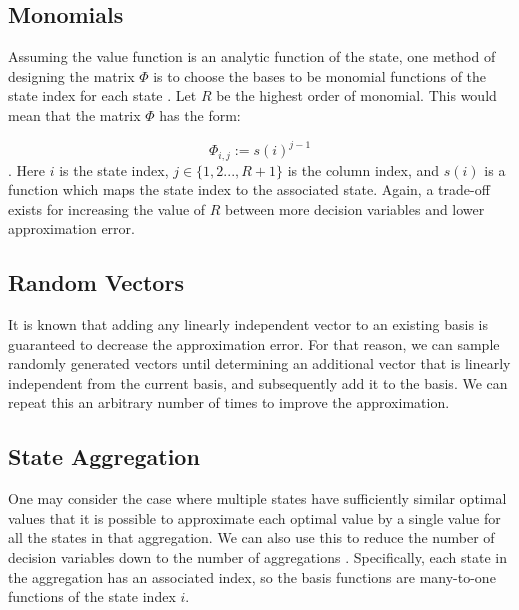 \documentclass[conference]{IEEEtran}
\begin{document}
\subsection{Monomials}
    Assuming the value function is an analytic function of the state, one method of designing the matrix $\Phi$ is to choose the bases to be monomial functions of the state index for each state \cite{bertsekas1995dynamic}\cite{478953}. Let $R$ be the highest order of monomial. This would mean that the matrix $\Phi$ has the form:
	
	\begin{displaymath}
        \Phi_{i,j}:=s(i)^{j-1}
    \end{displaymath}. Here $i$ is the state index, $j\in\{1,2...,R+1\}$ is the column index, and $s(i)$ is a function which maps the state index to the associated state. Again, a trade-off exists for increasing the value of $R$ between more decision variables and lower approximation error.
	

\subsection{Random Vectors}
    It is known that adding any linearly independent vector to an existing basis is guaranteed to decrease the approximation error. For that reason, we can sample randomly generated vectors until determining an additional vector that is linearly independent from the current basis, and subsequently add it to the basis. We can repeat this an arbitrary number of times to improve the approximation.


 \subsection{State Aggregation}
    
    One may consider the case where multiple states have sufficiently similar optimal values that it is possible to approximate each optimal value by a single value for all the states in that aggregation. We can also use this to reduce the number of decision variables down to the number of aggregations \cite{5717627}. Specifically, each state in the aggregation has an associated index, so the basis functions are many-to-one functions of the state index $i$.
    
\end{document}
